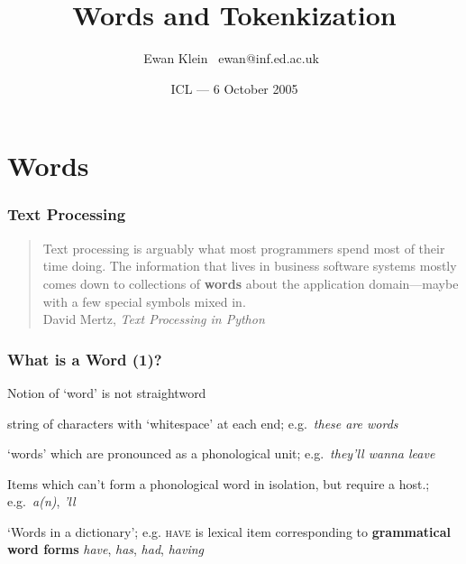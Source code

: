 \title{Words and Tokenkization }
\author{Ewan Klein \newline \mbox{ }ewan@inf.ed.ac.uk\mbox{ }}
\date{ICL --- 6 October 2005}



\frame{\titlepage}




\frame{\tableofcontents}

\section{Words}

\begin{frame}[fragile]
  \frametitle{Text Processing}



  \begin{quotation}
    \noindent
    Text processing is arguably what most programmers spend most of
    their time doing. The information that lives in business software
    systems mostly comes down to collections of \textbf{words} about the
    application domain---maybe with a few special symbols mixed in.\\
    \noindent
    David Mertz, \textit{Text Processing in Python}
  \end{quotation}
\end{frame}

\begin{frame}[fragile]
  \frametitle{What is a Word (1)?}



Notion of `word' is not straightword

\pause
    \begin{description}[<+->]
    \item[Orthographic word:] string of characters with `whitespace'
      at each end; e.g.\ \textit{these are words}

    \item[Phonological word:] `words' which are pronounced as a
      phonological unit; e.g.\ \textit{they'll wanna leave}

    \item[Clitic/Leaner:] Items which can't form a phonological word
      in isolation, but require a host.; e.g.\ \textit{a(n)},
      \textit{'ll}

    \item[Lexeme (lexical item):] `Words in a dictionary';
        e.g. \textsc{have} is lexical item corresponding to
        \textbf{grammatical word forms}
        \textit{have}, \textit{has}, \textit{had}, \textit{having}
    \end{description}

\end{frame}

